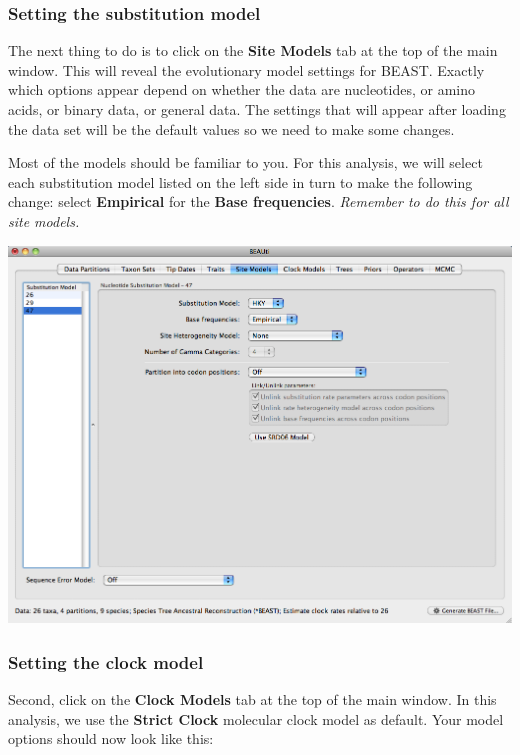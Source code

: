 \documentclass[12pt]{article}
\begin{document}
\medskip{}

\subsubsection*{Setting the substitution model}

The next thing to do is to click on the {\bf Site Models} tab at the top of the
main window. This will reveal the evolutionary model settings for
BEAST. Exactly which options appear depend on whether the data are
nucleotides, or amino acids, or binary data, or general data.
The settings that will appear after loading the data set will
be the default values so we need to make some changes. 

Most of the models should be familiar to you. For this analysis, we
will select each substitution model listed on the 
left side in turn to make the following change: select \textbf{Empirical} for the 
\textbf{Base frequencies}. {\it Remember to do this for all site models.}
\medskip{}

\includegraphics[scale=0.4]{figures/BEAUti_SiteModel}

\medskip{}

\subsubsection*{Setting the clock model}

Second, click on the {\bf Clock Models} tab at the top of the
main window. In this analysis, we use the \textbf{Strict Clock} molecular clock model as default.
Your model options should now look like this: 
\end{document}
